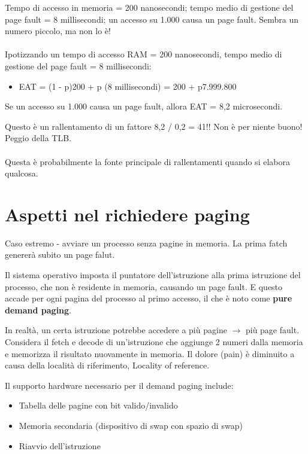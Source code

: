 Tempo di accesso in memoria = 200 nanosecondi; tempo medio di gestione del page fault = 8 millisecondi; un accesso su 1.000 causa un page fault. Sembra un numero piccolo, ma non lo è!

\paragraph{}
Ipotizzando un tempo di accesso RAM = 200 nanosecondi, tempo medio di gestione del page fault = 8 millisecondi:

\begin{itemize}
  \centering
  \item[] EAT = (1 - p)200 + p (8 millisecondi) = 200 + p7.999.800
\end{itemize}

Se un accesso su 1.000 causa un page fault, allora EAT = 8,2 microsecondi.

Questo è un rallentamento di un fattore 8,2 / 0,2 = 41!! Non è per niente buono!
Peggio della TLB.

\paragraph{}
Questa è probabilmente la fonte principale di rallentamenti quando si elabora qualcosa.

\section{Aspetti nel richiedere paging}



Caso estremo - avviare un processo senza pagine in memoria. La prima fatch genererà subito un
page falut.


Il sistema operativo imposta il puntatore dell'istruzione alla prima istruzione del processo,
che non è residente in memoria, causando un page fault. E questo accade per ogni pagina del
processo al primo accesso, il che è noto come \textbf{pure demand paging}.

In realtà, un certa istruzione potrebbe accedere a più pagine $\to$ più page fault.
Considera il fetch e decode di un'istruzione che aggiunge 2 numeri dalla memoria e
memorizza il risultato nuovamente in memoria. Il dolore (pain) è diminuito a causa della
località di riferimento, Locality of reference.


Il supporto hardware necessario per il demand paging include:
\begin{itemize}
  \item[] Tabella delle pagine con bit valido/invalido
  \item[] Memoria secondaria (dispositivo di swap con spazio di swap)
  \item[] Riavvio dell'istruzione
\end{itemize}

